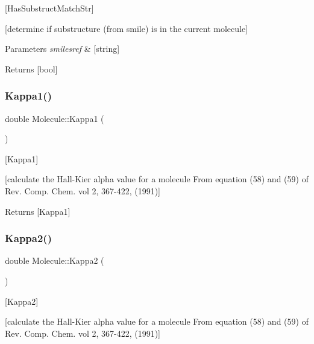 \mbox{[}Has\+Substruct\+Match\+Str\mbox{]} 

\mbox{[}determine if substructure (from smile) is in the current molecule\mbox{]}


\begin{DoxyParams}{Parameters}
{\em smilesref} & \mbox{[}string\mbox{]} \\
\hline
\end{DoxyParams}
\begin{DoxyReturn}{Returns}
\mbox{[}bool\mbox{]} 
\end{DoxyReturn}
\mbox{\label{class_molecule_ae4e3b1f59d36dde20ffded165b417288}} 
\subsubsection{\texorpdfstring{Kappa1()}{Kappa1()}}
{\footnotesize\ttfamily double Molecule\+::\+Kappa1 (\begin{DoxyParamCaption}{ }\end{DoxyParamCaption})}



\mbox{[}Kappa1\mbox{]} 

\mbox{[}calculate the Hall-\/\+Kier alpha value for a molecule From equation (58) and (59) of Rev. Comp. Chem. vol 2, 367-\/422, (1991)\mbox{]}

\begin{DoxyReturn}{Returns}
\mbox{[}Kappa1\mbox{]} 
\end{DoxyReturn}
\mbox{\label{class_molecule_a27ded481f6abb14e5531e645713effe3}} 
\subsubsection{\texorpdfstring{Kappa2()}{Kappa2()}}
{\footnotesize\ttfamily double Molecule\+::\+Kappa2 (\begin{DoxyParamCaption}{ }\end{DoxyParamCaption})}



\mbox{[}Kappa2\mbox{]} 

\mbox{[}calculate the Hall-\/\+Kier alpha value for a molecule From equation (58) and (59) of Rev. Comp. Chem. vol 2, 367-\/422, (1991)\mbox{]}

